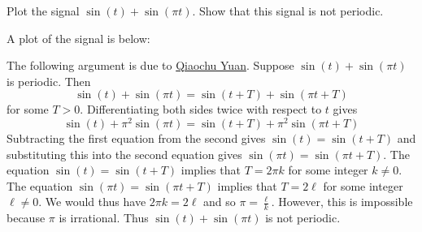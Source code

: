 \begin{excersizelist}
\item \label{exer:sinplussinnotper} Plot the signal $\sin(t) + \sin(\pi t)$.  Show that this signal is not periodic.
\begin{solution}
A plot of the signal is below:

\begin{center}
\end{center}

The following argument is due to \href{http://math.stackexchange.com/questions/1079/sum-of-two-periodic-functions}{Qiaochu Yuan}.  Suppose $\sin(t) + \sin(\pi t)$ is periodic.  Then
\[
\sin(t) + \sin(\pi t) = \sin(t + T) + \sin(\pi t + T)
\]
for some $T > 0$.  Differentiating both sides twice with respect to $t$ gives
\[
\sin(t) + \pi^2 \sin(\pi t) = \sin(t + T) + \pi^2\sin(\pi t + T)
\]
Subtracting the first equation from the second gives $\sin(t) = \sin(t + T)$ and substituting this into the second equation gives $\sin(\pi t) = \sin(\pi t + T)$.  The equation $\sin(t) = \sin(t + T)$ implies that $T = 2\pi k$ for some integer $k \neq 0$.  The equation $\sin(\pi t) = \sin(\pi t + T)$ implies that $T = 2 \ell$ for some integer $\ell \neq 0$.  We would thus have $2\pi k = 2 \ell$ and so $\pi = \tfrac{\ell}{k}$. However, this is impossible because $\pi$ is irrational.  Thus $\sin(t) + \sin(\pi t)$ is not periodic.
\end{solution}



\end{excersizelist}
